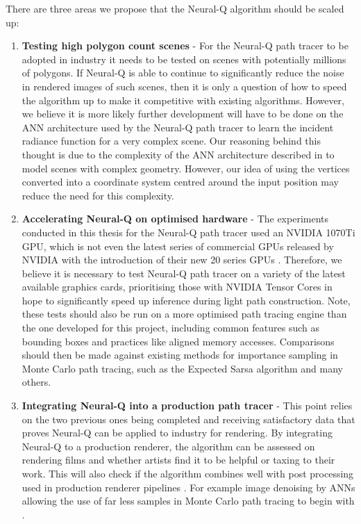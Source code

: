\documentclass[../dissertation.tex]{subfiles}
\begin{document}
There are three areas we propose that the Neural-Q algorithm should be scaled up:

\begin{enumerate}
\item \textbf{Testing high polygon count scenes} - For the Neural-Q path tracer to be adopted in industry it needs to be tested on scenes with potentially millions of polygons. If Neural-Q is able to continue to significantly reduce the noise in rendered images of such scenes, then it is only a question of how to speed the algorithm up to make it competitive with existing algorithms. However, we believe it is more likely further development will have to be done on the ANN architecture used by the Neural-Q path tracer to learn the incident radiance function for a very complex scene. Our reasoning behind this thought is due to the complexity of the ANN architecture described in \cite{muller2018neural} to model scenes with complex geometry. However, our idea of using the vertices converted into a coordinate system centred around the input position may reduce the need for this complexity.

\item \textbf{Accelerating Neural-Q on optimised hardware} - The experiments conducted in this thesis for the Neural-Q path tracer used an NVIDIA 1070Ti GPU, which is not even the latest series of commercial GPUs released by NVIDIA with the introduction of their new 20 series GPUs \cite{nvidia_turing_architecture_whitepaper_2018}. Therefore, we believe it is necessary to test Neural-Q path tracer on a variety of the latest available graphics cards, prioritising those with NVIDIA Tensor Cores \cite{tensor_cores} in hope to significantly speed up inference during light path construction. Note, these tests should also be run on a more optimised path tracing engine than the one developed for this project, including common features such as bounding boxes \cite{boulos2005notes} and practices like aligned memory accesses. Comparisons should then be made against existing methods for importance sampling in Monte Carlo path tracing, such as the Expected Sarsa algorithm and many others.

\item \textbf{Integrating Neural-Q into a production path tracer} - This point relies on the two previous ones being completed and receiving satisfactory data that proves Neural-Q can be applied to industry for rendering. By integrating Neural-Q to a production renderer, the algorithm can be assessed on rendering films and whether artists find it to be helpful or taxing to their work. This will also check if the algorithm combines well with post processing used in production renderer pipelines \cite{georgiev2018arnold, christensen2018renderman}. For example image denoising by ANNs allowing the use of far less samples in Monte Carlo path tracing to begin with \cite{bako2017kernel, chaitanya2017interactive}.
\end{enumerate}
\end{document}

